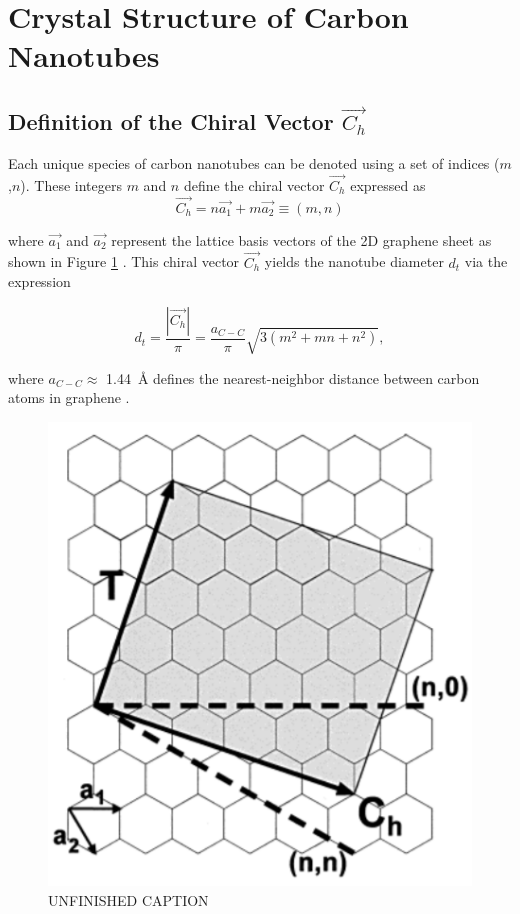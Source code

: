 \section{Crystal Structure of Carbon Nanotubes}

\subsection{Definition of the Chiral Vector $\vec{C_h}$}

Each unique species of carbon nanotubes can be	 denoted using a set of indices ($m$,$n$). These integers $m$ and $n$ define the chiral vector $\vec{C_h }$ expressed as 
\begin{equation}
	\vec{C_h} = n {\vec{a_1}} + m {\vec{a_2}} \equiv (m,n)
	\label{eq:chiral_vec}
\end{equation}

where $\vec{a_1}$ and $\vec{a_2}$ represent the lattice basis vectors of the 2D graphene sheet as shown in Figure \ref{fig:chiral_vectors} \cite{nanot2013single}. This chiral vector $\vec{C_h}$ yields the nanotube diameter $d_t$ via the expression

\begin{equation}
	d_t = \dfrac{|\vec{C_h}|}{\pi} = \dfrac{a_{C-C}}{\pi}\sqrt{3(m^2 + mn + n^2)},
\end{equation} 

where $a_{C-C} \approx$ \SI{1.44}{\angstrom} defines the nearest-neighbor distance between carbon atoms in graphene \cite{nanot2013single}.  

\begin{figure}[ht]
	\centering
	\includegraphics[scale=1]{images/chapter_optical_props/chiral_vectors_sheet.png}
	\caption{{\color{red}UNFINISHED CAPTION}}
	\label{fig:chiral_vectors}
\end{figure}

